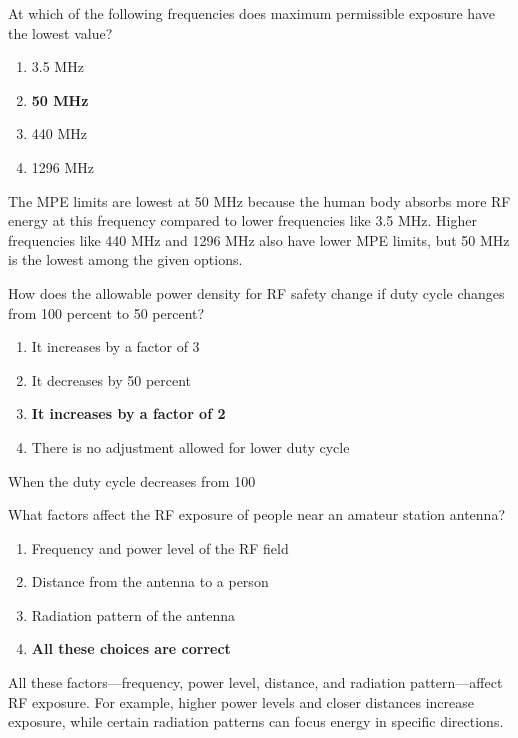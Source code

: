 \begin{tcolorbox}[colback=gray!10!white,colframe=black!75!black,title={T0C02}]
At which of the following frequencies does maximum permissible exposure have the lowest value?
\begin{enumerate}[label=\Alph*),noitemsep]
    \item 3.5 MHz
    \item \textbf{50 MHz}
    \item 440 MHz
    \item 1296 MHz
\end{enumerate}
\end{tcolorbox}
The MPE limits are lowest at 50 MHz because the human body absorbs more RF energy at this frequency compared to lower frequencies like 3.5 MHz. Higher frequencies like 440 MHz and 1296 MHz also have lower MPE limits, but 50 MHz is the lowest among the given options.

\begin{tcolorbox}[colback=gray!10!white,colframe=black!75!black,title={T0C03}]
How does the allowable power density for RF safety change if duty cycle changes from 100 percent to 50 percent?
\begin{enumerate}[label=\Alph*),noitemsep]
    \item It increases by a factor of 3
    \item It decreases by 50 percent
    \item \textbf{It increases by a factor of 2}
    \item There is no adjustment allowed for lower duty cycle
\end{enumerate}
\end{tcolorbox}
When the duty cycle decreases from 100%

\begin{tcolorbox}[colback=gray!10!white,colframe=black!75!black,title={T0C04}]
What factors affect the RF exposure of people near an amateur station antenna?
\begin{enumerate}[label=\Alph*),noitemsep]
    \item Frequency and power level of the RF field
    \item Distance from the antenna to a person
    \item Radiation pattern of the antenna
    \item \textbf{All these choices are correct}
\end{enumerate}
\end{tcolorbox}
All these factors—frequency, power level, distance, and radiation pattern—affect RF exposure. For example, higher power levels and closer distances increase exposure, while certain radiation patterns can focus energy in specific directions.

